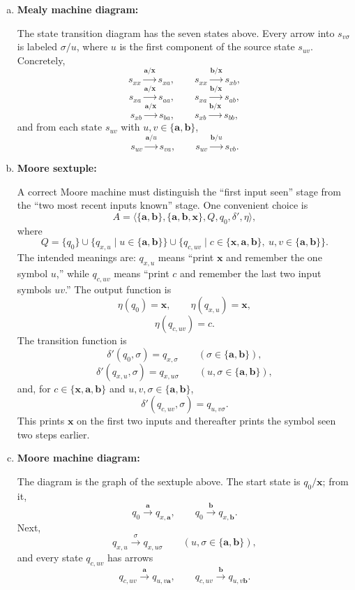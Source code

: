 \begin{enumerate}[{7.}1.]
\begin{enumerate}[(a)]
  \item \textbf{Mealy machine diagram:}

  The state transition diagram has the seven states above.  Every arrow into
  $s_{v\sigma}$ is labeled $\sigma/u$, where $u$ is the first component of the
  source state $s_{uv}$.  Concretely,
  \[
    s_{xx}\xrightarrow{\pmb{a}/\pmb{x}}s_{xa},\qquad
    s_{xx}\xrightarrow{\pmb{b}/\pmb{x}}s_{xb},
  \]
  \[
    s_{xa}\xrightarrow{\pmb{a}/\pmb{x}}s_{aa},\qquad
    s_{xa}\xrightarrow{\pmb{b}/\pmb{x}}s_{ab},
  \]
  \[
    s_{xb}\xrightarrow{\pmb{a}/\pmb{x}}s_{ba},\qquad
    s_{xb}\xrightarrow{\pmb{b}/\pmb{x}}s_{bb},
  \]
  and from each state $s_{uv}$ with $u,v\in\{\pmb{a},\pmb{b}\}$,
  \[
    s_{uv}\xrightarrow{\pmb{a}/u}s_{va},\qquad
    s_{uv}\xrightarrow{\pmb{b}/u}s_{vb}.
  \]

  \item \textbf{Moore sextuple:}

  A correct Moore machine must distinguish the ``first input seen'' stage from
  the ``two most recent inputs known'' stage.  One convenient choice is
  \[
    A=\langle\{\pmb{a},\pmb{b}\},\{\pmb{a},\pmb{b},\pmb{x}\},Q,q_0,\delta',\eta\rangle,
  \]
  where
  \[
    Q=\{q_0\}\cup\{q_{x,u}\mid u\in\{\pmb{a},\pmb{b}\}\}
      \cup\{q_{c,uv}\mid c\in\{\pmb{x},\pmb{a},\pmb{b}\},\
      u,v\in\{\pmb{a},\pmb{b}\}\}.
  \]
  The intended meanings are:
  $q_{x,u}$ means ``print $\pmb{x}$ and remember the one symbol $u$,'' while
  $q_{c,uv}$ means ``print $c$ and remember the last two input symbols $uv$.'' 
  The output function is
  \[
    \eta(q_0)=\pmb{x},\qquad
    \eta(q_{x,u})=\pmb{x},
  \]
  \[
    \eta(q_{c,uv})=c.
  \]
  The transition function is
  \[
    \delta'(q_0,\sigma)=q_{x,\sigma}
    \qquad(\sigma\in\{\pmb{a},\pmb{b}\}),
  \]
  \[
    \delta'(q_{x,u},\sigma)=q_{x,u\sigma}
    \qquad(u,\sigma\in\{\pmb{a},\pmb{b}\}),
  \]
  and, for $c\in\{\pmb{x},\pmb{a},\pmb{b}\}$ and
  $u,v,\sigma\in\{\pmb{a},\pmb{b}\}$,
  \[
    \delta'(q_{c,uv},\sigma)=q_{u,v\sigma}.
  \]
  This prints $\pmb{x}$ on the first two inputs and thereafter prints the symbol
  seen two steps earlier.

  \item \textbf{Moore machine diagram:}

  The diagram is the graph of the sextuple above.  The start state is
  $q_0/\pmb{x}$; from it,
  \[
    q_0\xrightarrow{\pmb{a}}q_{x,\pmb{a}},\qquad
    q_0\xrightarrow{\pmb{b}}q_{x,\pmb{b}}.
  \]
  Next,
  \[
    q_{x,u}\xrightarrow{\sigma}q_{x,u\sigma}
    \qquad(u,\sigma\in\{\pmb{a},\pmb{b}\}),
  \]
  and every state $q_{c,uv}$ has arrows
  \[
    q_{c,uv}\xrightarrow{\pmb{a}}q_{u,v\pmb{a}},\qquad
    q_{c,uv}\xrightarrow{\pmb{b}}q_{u,v\pmb{b}}.
  \]
\end{enumerate}


\end{enumerate}
